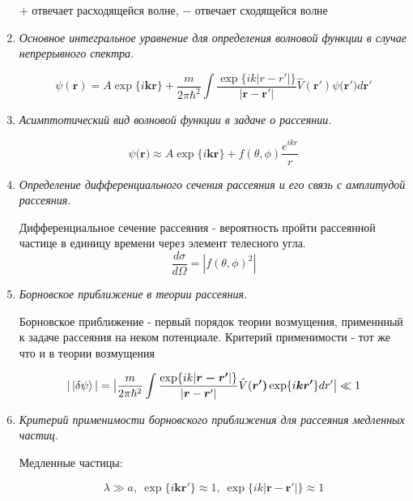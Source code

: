 \documentclass{article}
\begin{document}
\begin{enumerate}
		$+$ отвечает расходящейся волне, $-$ отвечает сходящейся волне
		
		\item \textit{Основное интегральное уравнение для определения волновой функции в случае непрерывного спектра.}
		
		\begin{equation}
			\psi(\boldsymbol{r})=A\exp\{i\boldsymbol{kr}\}+\frac{m}{2\pi\hbar^{2}}\int\frac{\exp\{ik|r-r'|\}}{|\boldsymbol{r-r'}|}\hat{V}(\boldsymbol{r'})\psi(\boldsymbol{r')}d\boldsymbol{r'}
		\end{equation}
		
		\item \textit{Асимптотический вид волновой функции в задаче о рассеянии.}
		
		\begin{equation}
			\psi(\boldsymbol{r)}\approx A\exp\{i\boldsymbol{kr}\}+f(\theta,\phi)\frac{e^{ikr}}{r}
		\end{equation}
		
		\item \textit{Определение дифференциального сечения рассеяния и его связь с амплитудой рассеяния.}
		
		Дифференциальное сечение рассеяния - вероятность пройти рассеянной
частице в единицу времени через элемент телесного угла.
		\begin{equation}
			\frac{d\sigma}{d\Omega}=|f(\theta,\phi)^{2}|
		\end{equation}
		
		\item \textit{Борновское приближение в теории рассеяния.}

		Борновское приближение - первый порядок теории возмущения, применнный
к задаче рассеяния на неком потенциале. Критерий применимости -  тот же
что и в теории возмущения

		\begin{equation}
			|\ket{\delta\psi}|=\big|\frac{m}{2\pi\hbar^{2}}\int\frac{\exp\{ik|\boldsymbol{r-r'}|\}}{|\boldsymbol{r}-\boldsymbol{r}'|}\hat{V}(\boldsymbol{r')}\exp\{i\boldsymbol{kr'}\}dr'\big|\ll1
		\end{equation}
		
		\item \textit{Критерий применимости борновского приближения для рассеяния медленных частиц.}
		
		Медленные частицы:
		
		\begin{equation}
			\lambda\gg a,\ \exp\{i\boldsymbol{kr'}\}\approx1,\ \exp\{ik|\boldsymbol{r-r'}|\}\approx1
		\end{equation}
		

\end{enumerate}
\end{document}
